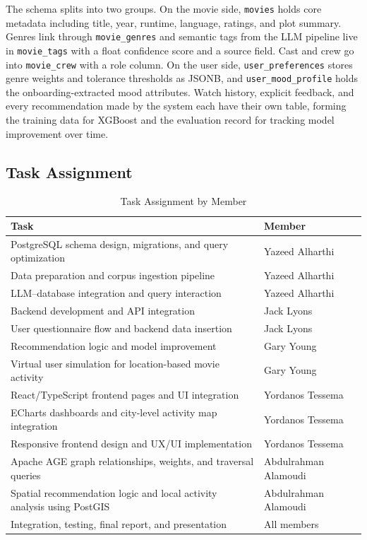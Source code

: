 \documentclass[conference]{IEEEtran}
\begin{document}
The schema splits into two groups. On the movie side, \texttt{movies} holds core metadata including title, year, runtime, language, ratings, and plot summary. Genres link through \texttt{movie\_genres} and semantic tags from the LLM pipeline live in \texttt{movie\_tags} with a float confidence score and a source field. Cast and crew go into \texttt{movie\_crew} with a role column. On the user side, \texttt{user\_preferences} stores genre weights and tolerance thresholds as JSONB, and \texttt{user\_mood\_profile} holds the onboarding-extracted mood attributes. Watch history, explicit feedback, and every recommendation made by the system each have their own table, forming the training data for XGBoost and the evaluation record for tracking model improvement over time.

\vspace{6pt}

\subsection*{Task Assignment}

\begin{table}[h]
\centering
\renewcommand{\arraystretch}{1.3}
\caption{Task Assignment by Member}
\setlength{\tabcolsep}{5pt}
\begin{tabular}{>{\raggedright\arraybackslash}p{5.6cm} >{\raggedright\arraybackslash}p{2.5cm}}
\toprule
\textbf{Task} & \textbf{Member} \\
\midrule
PostgreSQL schema design, migrations, and query optimization & Yazeed Alharthi \\
Data preparation and corpus ingestion pipeline & Yazeed Alharthi \\
LLM--database integration and query interaction & Yazeed Alharthi \\
Backend development and API integration & Jack Lyons \\
User questionnaire flow and backend data insertion & Jack Lyons \\
Recommendation logic and model improvement & Gary Young \\
Virtual user simulation for location-based movie activity & Gary Young \\
React/TypeScript frontend pages and UI integration & Yordanos Tessema \\
ECharts dashboards and city-level activity map integration & Yordanos Tessema \\
Responsive frontend design and UX/UI implementation & Yordanos Tessema \\
Apache AGE graph relationships, weights, and traversal queries & Abdulrahman Alamoudi \\
Spatial recommendation logic and local activity analysis using PostGIS & Abdulrahman Alamoudi \\
Integration, testing, final report, and presentation & All members \\
\bottomrule
\end{tabular}
\end{table}
\end{document}
